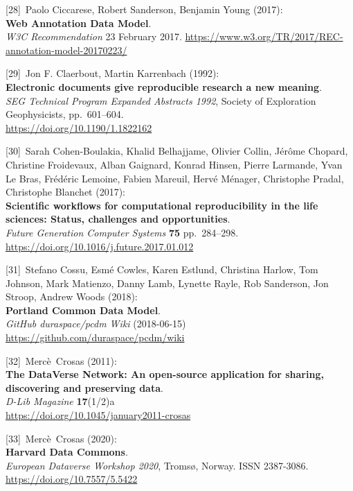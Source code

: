 {[}28{]}~Paolo Ciccarese, Robert Sanderson, Benjamin Young (2017):\\
\textbf{Web Annotation Data Model}.\\
\emph{W3C Recommendation} 23 February 2017.
\url{https://www.w3.org/TR/2017/REC-annotation-model-20170223/}

{[}29{]}~Jon F. Claerbout, Martin Karrenbach (1992):\\
\textbf{Electronic documents give reproducible research a new
meaning}.\\
\emph{SEG Technical Program Expanded Abstracts 1992}, Society of
Exploration Geophysicists, pp.~601--604.\\
\url{https://doi.org/10.1190/1.1822162}

{[}30{]}~Sarah Cohen-Boulakia, Khalid Belhajjame, Olivier Collin, Jérôme
Chopard, Christine Froidevaux, Alban Gaignard, Konrad Hinsen, Pierre
Larmande, Yvan Le Bras, Frédéric Lemoine, Fabien Mareuil, Hervé Ménager,
Christophe Pradal, Christophe Blanchet (2017):\\
\textbf{Scientific workflows for computational reproducibility in the
life sciences: Status, challenges and opportunities}.\\
\emph{Future Generation Computer Systems} \textbf{75} pp.~284--298.\\
\url{https://doi.org/10.1016/j.future.2017.01.012}

{[}31{]}~Stefano Cossu, Esmé Cowles, Karen Estlund, Christina Harlow,
Tom Johnson, Mark Matienzo, Danny Lamb, Lynette Rayle, Rob Sanderson,
Jon Stroop, Andrew Woods (2018):\\
\textbf{Portland Common Data Model}.\\
\emph{GitHub duraspace/pcdm Wiki} (2018-06-15)
\url{https://github.com/duraspace/pcdm/wiki}

{[}32{]}~Mercè~Crosas (2011):\\
\textbf{The DataVerse Network: An open-source application for sharing,
discovering and preserving data}.\\
\emph{D-Lib Magazine} \textbf{17}(1/2)a\\
\url{https://doi.org/10.1045/january2011-crosas}

{[}33{]}~Mercè~Crosas (2020):\\
\textbf{Harvard Data Commons}.\\
\emph{European Dataverse Workshop 2020}, Tromsø, Norway. ISSN
2387-3086.\\
\url{https://doi.org/10.7557/5.5422}

